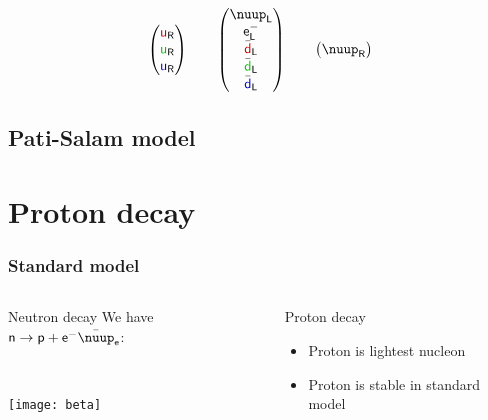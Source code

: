 \documentclass[english, fleqn]{beamer}
\begin{document}
\begin{frame}
\[\begin{pmatrix}
            \textcolor{qred}  {\mathsf u}_\mathsf R \\
            \textcolor{qgreen}{\mathsf u}_\mathsf R \\
            \textcolor{qblue} {\mathsf u}_\mathsf R
        \end{pmatrix}
        \qquad
        \begin{pmatrix}
            \nuup_\mathsf L \\
            \mathsf e^-_\mathsf L \\
            \bar{\textcolor{qred}  {\mathsf d}}_\mathsf L \\
            \bar{\textcolor{qgreen}{\mathsf d}}_\mathsf L \\
            \bar{\textcolor{qblue} {\mathsf d}}_\mathsf L
        \end{pmatrix}
        \qquad
        \begin{pmatrix}
            \nuup_\mathsf R
        \end{pmatrix}
    \]

    \parencite{Baez/Algebra_GUT}
\end{frame}

\subsection{Pati-Salam model}

\begin{frame}
    \parencite{Wu/Proton-decay}

\end{frame}

\section{Proton decay}

\begin{frame}
    \frametitle{Standard model}

    \begin{columns}[t]
        \begin{column}{.5\linewidth}
            \begin{block}{Neutron decay}
                We have $\mathsf n \to \mathsf p + \mathsf e^- \bar\nuup_{\mathsf e}$:

                \

                \texttt{[image: beta]}
            \end{block}
        \end{column}
        \pause
        \begin{column}{.5\linewidth}
            \begin{block}{Proton decay}
                \begin{itemize}
                    \item Proton is lightest nucleon
                    \item \alert{Proton is stable in standard model}
                \end{itemize}
            \end{block}
        \end{column}
    \end{columns}
\end{frame}
\end{document}
